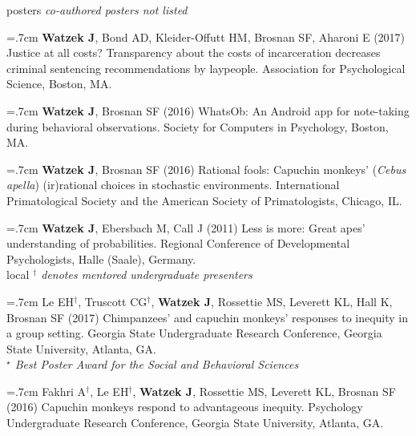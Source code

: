 \documentclass[]{friggeri-cv}
\begin{document}

{\subfont\large{} posters}
% 
\hspace{.35cm} {\small{} \emph{co-authored posters not listed}} %

\hangindent=.7cm \textbf{Watzek J}, Bond AD, Kleider-Offutt HM, Brosnan SF, Aharoni E (2017) Justice at all costs? Transparency about the costs of incarceration decreases criminal sentencing recommendations by laypeople. Association for Psychological Science, Boston, MA.

\hangindent=.7cm \textbf{Watzek J}, Brosnan SF (2016) WhatsOb: An Android app for note-taking during behavioral observations. Society for Computers in Psychology, Boston, MA.

\hangindent=.7cm \textbf{Watzek J}, Brosnan SF (2016) Rational fools: Capuchin monkeys' (\emph{Cebus apella}) (ir)rational choices in stochastic environments. International Primatological Society and the American Society of Primatologists, Chicago, IL.

\hangindent=.7cm \textbf{Watzek J}, Ebersbach M, Call J (2011) Less is more: Great apes' understanding of probabilities. Regional Conference of Developmental Psychologists, Halle (Saale), Germany.\\[-.1cm]



{\subfont\large{} local}%
% 
\hspace{.35cm} {\small{} \emph{${}^\dagger$ denotes mentored undergraduate presenters}}

\hangindent=.7cm Le EH${}^\dagger$, Truscott CG${}^\dagger$, \textbf{Watzek J}, Rossettie MS, Leverett KL, Hall K, Brosnan SF (2017) Chimpanzees' and capuchin monkeys' responses to inequity in a group setting. Georgia State Undergraduate Research Conference, Georgia State University, Atlanta, GA.\\ \emph{${}^\star$ Best Poster Award for the Social and Behavioral Sciences}

\hangindent=.7cm Fakhri A${}^\dagger$, Le EH${}^\dagger$, \textbf{Watzek J}, Rossettie MS, Leverett KL, Brosnan SF (2016) Capuchin monkeys respond to advantageous inequity. Psychology Undergraduate Research Conference, Georgia State University, Atlanta, GA.\\[-.1cm]
\end{document}
